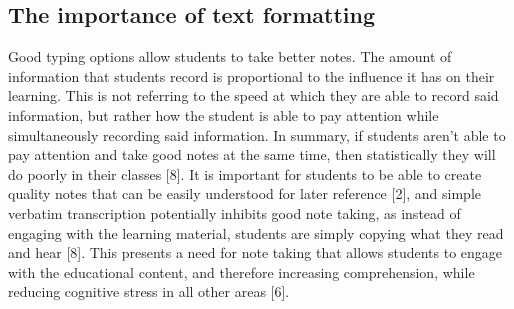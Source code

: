 \documentclass[conference]{IEEEtran}
\begin{document}
\subsection{The importance of text formatting}
Good typing options allow students to take better notes. The amount of information that students record is proportional to the influence it has on their learning. This is not referring to the speed at which they are able to record said information, but rather how the student is able to pay attention while simultaneously recording said information. In summary, if students aren’t able to pay attention and take good notes at the same time, then statistically they will do poorly in their classes [8]. It is important for students to be able to create quality notes that can be easily understood for later reference [2], and simple verbatim transcription potentially inhibits good note taking, as instead of engaging with the learning material, students are simply copying what they read and hear [8]. This presents a need for note taking that allows students to engage with the educational content, and therefore increasing comprehension, while reducing cognitive stress in all other areas [6].
\end{document}
